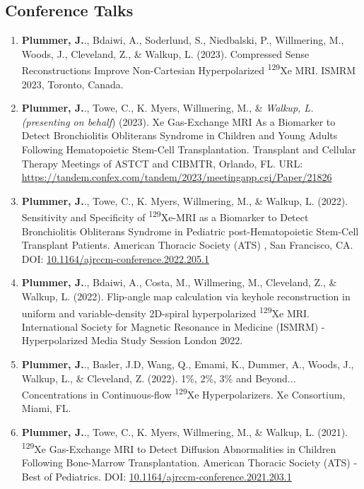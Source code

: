\documentclass[12pt,]{scrartcl}
\begin{document}
\subsection{Conference Talks}\label{conferences_presentations}

\begin{enumerate}
  \leftskip-0.13in %
  
  \item \textbf{Plummer, J.}., Bdaiwi, A., Soderlund, S., Niedbalski, P., Willmering, M., Woods, J., Cleveland, Z., \& Walkup, L. (2023). Compressed Sense Reconstructions Improve Non-Cartesian Hyperpolarized \textsuperscript{129}Xe MRI. ISMRM 2023, Toronto, Canada.
  
  \item \textbf{Plummer, J.}., Towe, C., K. Myers, Willmering, M., \&  \textit{Walkup, L. (presenting on behalf}) (2023). Xe Gas-Exchange MRI As a Biomarker to Detect Bronchiolitis Obliterans Syndrome in Children and Young Adults Following Hematopoietic Stem-Cell Transplantation. Transplant and Cellular Therapy Meetings of ASTCT and CIBMTR, Orlando, FL. URL: \href{https://tandem.confex.com/tandem/2023/meetingapp.cgi/Paper/21826}{https://tandem.confex.com/tandem/2023/meetingapp.cgi/Paper/21826}
  
  \item \textbf{Plummer, J.}., Towe, C., K. Myers, Willmering, M., \& Walkup, L. (2022). Sensitivity and Specificity of \textsuperscript{129}Xe-MRI as a Biomarker to Detect Bronchiolitis Obliterans Syndrome in Pediatric post-Hematopoietic Stem-Cell Transplant Patients. American Thoracic Society (ATS) , San Francisco, CA. DOI: \href{https://www.atsjournals.org/doi/abs/10.1164/ajrccm-conference.2022.205.1_MeetingAbstracts.A2181}{10.1164/ajrccm-conference.2022.205.1}
  
  \item \textbf{Plummer, J.}., Bdaiwi, A., Costa, M., Willmering, M., Cleveland, Z., \& Walkup, L. (2022). Flip-angle map calculation via keyhole reconstruction in uniform and variable-density 2D-spiral hyperpolarized \textsuperscript{129}Xe MRI. International Society for Magnetic Resonance in Medicine (ISMRM) - Hyperpolarized Media Study Session London 2022.
  
  \item \textbf{Plummer, J.}., Basler, J.D, Wang, Q., Emami, K., Dummer, A., Woods, J., Walkup, L., \& Cleveland, Z. (2022). 1\%, 2\%, 3\% and Beyond... Concentrations in Continuous-flow \textsuperscript{129}Xe Hyperpolarizers. Xe Consortium, Miami, FL.
  
  \item \textbf{Plummer, J.}., Towe, C., K. Myers, Willmering, M., \& Walkup, L. (2021). \textsuperscript{129}Xe Gas-Exchange MRI to Detect Diffusion Abnormalities in Children Following Bone-Marrow Transplantation. American Thoracic Society (ATS) - Best of Pediatrics. DOI: \href{http://dx.doi.org/10.1164/ajrccm-conference.2021.203.1_MeetingAbstracts.A1166}{10.1164/ajrccm-conference.2021.203.1}
  
  
\end{enumerate}
\end{document}
